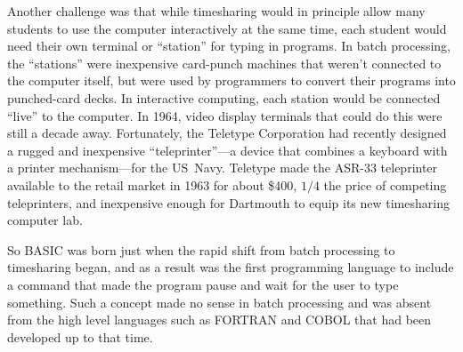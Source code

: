 Another challenge was that
while timesharing would in principle allow many students to use the
computer interactively at the same time, each student
would need their own terminal or ``station'' for typing in programs.  In batch
processing, the ``stations'' were inexpensive card-punch machines
that weren't connected to the computer itself, but were used by programmers
to convert their programs into punched-card decks.  In interactive
computing, each station would be connected ``live'' to the computer.
In 1964, video display terminals that could do this were still a decade away.
Fortunately, the Teletype Corporation had recently designed a rugged and
inexpensive ``teleprinter''---a device that combines a keyboard with a
printer mechanism---for the US~Navy.
Teletype made the ASR-33 teleprinter
available to the retail market in 1963 for about \$400, $1/4$ the price of
competing teleprinters, and inexpensive enough for Dartmouth to equip
its new timesharing computer lab.


So BASIC was born just when the rapid shift from batch processing to
timesharing began, and as a result
was the first programming language to include a command that made
the program pause and wait for the user to type
something.  Such a concept made no sense in batch processing and was
absent from the high level languages such as FORTRAN and COBOL that had
been developed up to that time.
 
